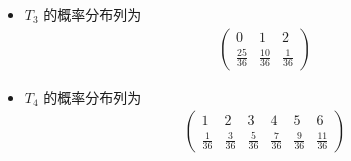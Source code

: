 \documentclass[Prob-All.tex]{subfiles}
\begin{document}
\begin{frame}
	\begin{itemize}[<+-|alert@+>]

		\item $T_3$ 的概率分布列为 \pause
		      \begin{eqnarray*}
			      \left(\begin{array}{ccc}
				      0             & 1             & 2            \\
				      \frac{25}{36} & \frac{10}{36} & \frac{1}{36}
			      \end{array}\right)
		      \end{eqnarray*}

		\item $T_4$ 的概率分布列为 \pause
		      \begin{eqnarray*}
			      \left(\begin{array}{cccccc}
				      1            & 2            & 3            & 4            & 5            & 6             \\
				      \frac{1}{36} & \frac{3}{36} & \frac{5}{36} & \frac{7}{36} & \frac{9}{36} & \frac{11}{36}
			      \end{array}\right)
		      \end{eqnarray*}
	\end{itemize}

\end{frame}



\end{document}
